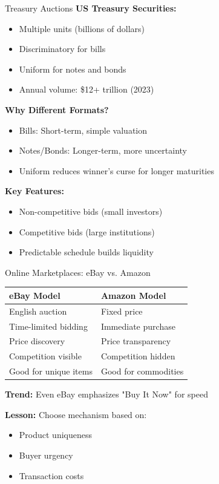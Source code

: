 \documentclass[xcolor={x11names}, aspectratio=169 ]{beamer}
\begin{document}
\begin{frame}{Treasury Auctions}
\textbf{US Treasury Securities:}
\begin{itemize}
  \item Multiple units (billions of dollars)
  \item Discriminatory for bills
  \item Uniform for notes and bonds
  \item Annual volume: \$12+ trillion (2023)
\end{itemize}

\textbf{Why Different Formats?}
\begin{itemize}
  \item Bills: Short-term, simple valuation
  \item Notes/Bonds: Longer-term, more uncertainty
  \item Uniform reduces winner's curse for longer maturities
\end{itemize}

\textbf{Key Features:}
\begin{itemize}
  \item Non-competitive bids (small investors)
  \item Competitive bids (large institutions)
  \item Predictable schedule builds liquidity
\end{itemize}
\end{frame}

\begin{frame}{Online Marketplaces: eBay vs. Amazon}
\begin{center}
\begin{tabular}{p{4.5cm}p{4.5cm}}
\toprule
\textbf{eBay Model} & \textbf{Amazon Model} \\
\midrule
\rowcolor{blue!10}
English auction & Fixed price \\
\rowcolor{green!10}
Time-limited bidding & Immediate purchase \\
\rowcolor{blue!10}
Price discovery & Price transparency \\
\rowcolor{green!10}
Competition visible & Competition hidden \\
\rowcolor{blue!10}
Good for unique items & Good for commodities \\
\bottomrule
\end{tabular}
\end{center}

\textbf{Trend:} Even eBay emphasizes "Buy It Now" for speed

\textbf{Lesson:} Choose mechanism based on:
\begin{itemize}
  \item Product uniqueness
  \item Buyer urgency
  \item Transaction costs
\end{itemize}
\end{frame}
\end{document}
